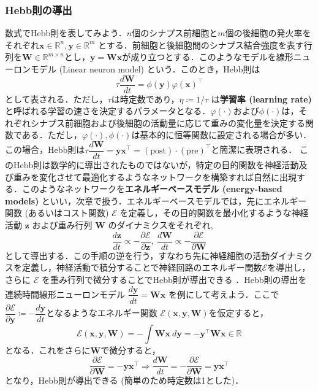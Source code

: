 \subsubsection{Hebb則の導出}
数式でHebb則を表してみよう．$n$個のシナプス前細胞と$m$個の後細胞の発火率をそれぞれ$\mathbf{x}\in \mathbb{R}^n, \mathbf{y}\in \mathbb{R}^m$ とする．前細胞と後細胞間のシナプス結合強度を表す行列を$\mathbf{W}\in \mathbb{R}^{m\times n}$とし，$\mathbf{y}=\mathbf{W}\mathbf{x}$が成り立つとする．このようなモデルを線形ニューロンモデル (Linear neuron model) という．このとき，Hebb則は
\begin{equation}
\tau\frac{d\mathbf{W}}{dt}=\phi(\mathbf{y})\varphi(\mathbf{x})^\top
\end{equation}
として表される．ただし，$\tau$は時定数であり，$\eta\coloneqq1/\tau$ は\textbf{学習率 (learning rate)} と呼ばれる学習の速さを決定するパラメータとなる．$\varphi(\cdot)$および$\phi(\cdot)$は，それぞれシナプス前細胞および後細胞の活動量に応じて重みの変化量を決定する関数である．ただし，$\varphi(\cdot), \phi(\cdot)$は基本的に恒等関数に設定される場合が多い．この場合，Hebb則は$
\tau\dfrac{d\mathbf{W}}{dt}=\mathbf{y}\mathbf{x}^\top=(\text{post})\cdot (\text{pre})^\top
$と簡潔に表現される．
このHebb則は数学的に導出されたものではないが，特定の目的関数を神経活動及び重みを変化させて最適化するようなネットワークを構築すれば自然に出現する．このようなネットワークを\textbf{エネルギーベースモデル (energy-based models)} といい，次章で扱う．エネルギーベースモデルでは，先にエネルギー関数 (あるいはコスト関数) $\mathcal{E}$ を定義し，その目的関数を最小化するような神経活動 $\mathbf{z}$ および重み行列 $\mathbf{W}$ のダイナミクスをそれぞれ,
\begin{equation}
\frac{d \mathbf{z}}{dt}\propto-\frac{\partial \mathcal{E}}{\partial \mathbf{z}},\ \frac{d \mathbf{W}}{dt}\propto-\frac{\partial \mathcal{E}}{\partial \mathbf{W}}
\end{equation}
として導出する．この手順の逆を行う，すなわち先に神経細胞の活動ダイナミクスを定義し，神経活動で積分することで神経回路のエネルギー関数$\mathcal{E}$を導出し，さらに $\mathcal{E}$ を重み行列で微分することでHebb則が導出できる \citep{Isomura2020-sn}．Hebb則の導出を連続時間線形ニューロンモデル $\dfrac{d\mathbf{y}}{dt}=\mathbf{W}\mathbf{x}$ を例にして考えよう．ここで$\dfrac{\partial\mathcal{E}}{\partial\mathbf{y}}\coloneqq-\dfrac{d\mathbf{y}}{dt}$となるようなエネルギー関数 $\mathcal{E}(\mathbf{x}, \mathbf{y}, \mathbf{W})$を仮定すると，
\begin{equation}
\mathcal{E}(\mathbf{x}, \mathbf{y}, \mathbf{W})=-\int \mathbf{W}\mathbf{x}\ d\mathbf{y}=-\mathbf{y}^\top \mathbf{W}\mathbf{x} \in \mathbb{R}
\end{equation}
となる．これをさらに$\mathbf{W}$で微分すると，
\begin{equation}
\dfrac{\partial\mathcal{E}}{\partial\mathbf{W}}=-\mathbf{y}\mathbf{x}^\top\Rightarrow
\frac{d\mathbf{W}}{dt}=-\dfrac{\partial\mathcal{E}}{\partial\mathbf{W}}=\mathbf{y}\mathbf{x}^\top
\end{equation}
となり，Hebb則が導出できる (簡単のため時定数は1とした)．
